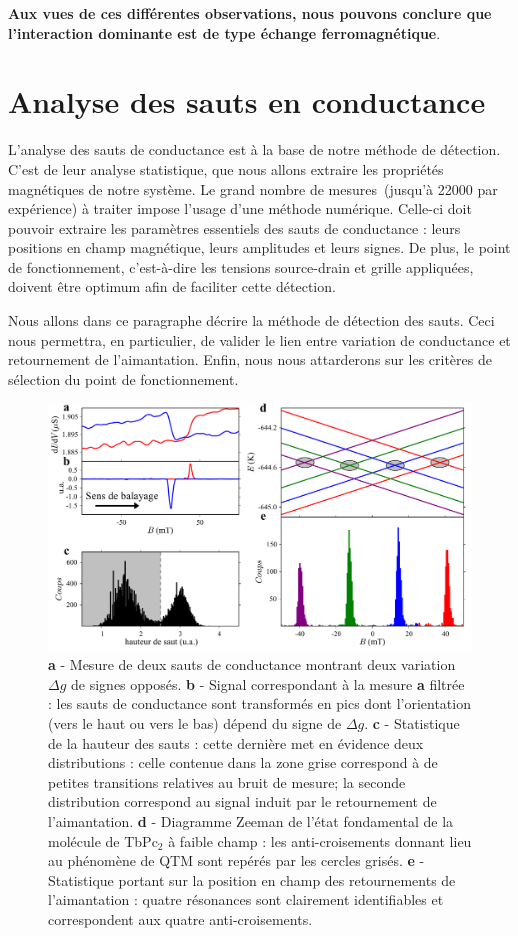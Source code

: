 \textbf{Aux vues de ces différentes observations, nous pouvons conclure que l'interaction dominante est de type échange ferromagnétique}.

\section{Analyse des sauts en conductance}
L'analyse des sauts de conductance est à la base de notre méthode de détection. C'est de leur analyse statistique, que nous allons extraire les propriétés magnétiques de notre système. Le grand nombre de mesures~(jusqu'à 22000 par expérience) à traiter impose l'usage d'une méthode numérique. Celle-ci doit pouvoir extraire les paramètres essentiels des sauts de conductance : leurs positions en champ magnétique, leurs amplitudes et leurs signes. De plus, le point de fonctionnement, c'est-à-dire les tensions source-drain et grille appliquées, doivent être optimum afin de faciliter cette détection. 

Nous allons dans ce paragraphe décrire la méthode de détection des sauts. Ceci nous permettra, en particulier, de valider le lien entre variation de conductance et retournement de l'aimantation. Enfin, nous nous attarderons sur les critères de sélection du point de fonctionnement.

\begin{figure}
\includegraphics[scale=0.45]{Resultats/CondJump/CondJump.pdf} 
\caption{\textbf{a} - Mesure de deux sauts de conductance montrant deux variation $\Delta g$ de signes opposés. \textbf{b} - Signal correspondant à la mesure \textbf{a} filtrée : les sauts de conductance sont transformés en pics dont l'orientation (vers le haut ou vers le bas) dépend du signe de $\Delta g$. \textbf{c} - Statistique de la hauteur des sauts : cette dernière met en évidence deux distributions : celle contenue dans la zone grise correspond à de petites transitions relatives au bruit de mesure; la seconde distribution correspond au signal induit par le retournement de l'aimantation. \textbf{d} - Diagramme Zeeman de l'état fondamental de la molécule de TbPc$_2$ à faible champ : les anti-croisements donnant lieu au phénomène de QTM sont repérés par les cercles grisés. \textbf{e} - Statistique portant sur la position en champ des retournements de l'aimantation : quatre résonances sont clairement identifiables et correspondent aux quatre anti-croisements.}
\label{analyse_saut}
\end{figure}


